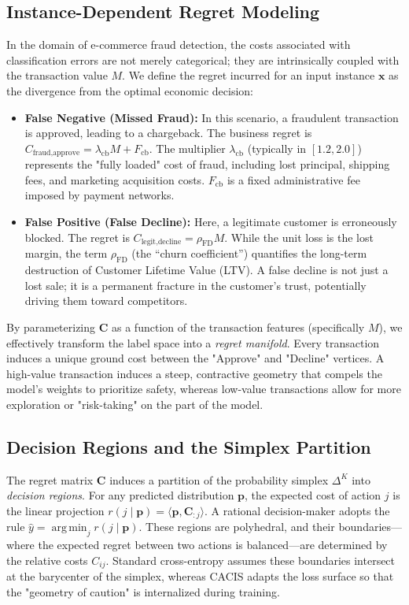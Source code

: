 \documentclass[sigconf,anonymous]{acmart}
\newcommand{\CACIS}{\textsc{CACIS}}
\newcommand{\vx}{\mathbf{x}}
\newcommand{\vp}{\mathbf{p}}
\newcommand{\mC}{\mathbf{C}}
\DeclareMathOperator*{\argmin}{arg\,min}
\begin{document}
\subsection{Instance-Dependent Regret Modeling}
In the domain of e-commerce fraud detection, the costs associated with classification errors are not merely categorical; they are intrinsically coupled with the transaction value $M$. We define the regret incurred for an input instance $\vx$ as the divergence from the optimal economic decision:
\begin{itemize}[leftmargin=*]
    \item \textbf{False Negative (Missed Fraud):} In this scenario, a fraudulent transaction is approved, leading to a chargeback. The business regret is $C_{\text{fraud}, \text{approve}} = \lambda_{\mathrm{cb}} M + F_{\mathrm{cb}}$. The multiplier $\lambda_{\mathrm{cb}}$ (typically in $[1.2, 2.0]$) represents the "fully loaded" cost of fraud, including lost principal, shipping fees, and marketing acquisition costs. $F_{\mathrm{cb}}$ is a fixed administrative fee imposed by payment networks.
    \item \textbf{False Positive (False Decline):} Here, a legitimate customer is erroneously blocked. The regret is $C_{\text{legit}, \text{decline}} = \rho_{\mathrm{FD}} M$. While the unit loss is the lost margin, the term $\rho_{\mathrm{FD}}$ (the ``churn coefficient'') quantifies the long-term destruction of Customer Lifetime Value (LTV). A false decline is not just a lost sale; it is a permanent fracture in the customer's trust, potentially driving them toward competitors.
\end{itemize}

By parameterizing $\mC$ as a function of the transaction features (specifically $M$), we effectively transform the label space into a \emph{regret manifold}. Every transaction induces a unique ground cost between the "Approve" and "Decline" vertices. A high-value transaction induces a steep, contractive geometry that compels the model's weights to prioritize safety, whereas low-value transactions allow for more exploration or "risk-taking" on the part of the model.

\subsection{Decision Regions and the Simplex Partition}
The regret matrix $\mC$ induces a partition of the probability simplex $\Delta^K$ into \emph{decision regions}. For any predicted distribution $\vp$, the expected cost of action $j$ is the linear projection $r(j \mid \vp) = \langle \vp, \mC_{:j} \rangle$. A rational decision-maker adopts the rule $\hat{y} = \argmin_j r(j \mid \vp)$. These regions are polyhedral, and their boundaries—where the expected regret between two actions is balanced—are determined by the relative costs $C_{ij}$. Standard cross-entropy assumes these boundaries intersect at the barycenter of the simplex, whereas \CACIS{} adapts the loss surface so that the "geometry of caution" is internalized during training.
\end{document}
